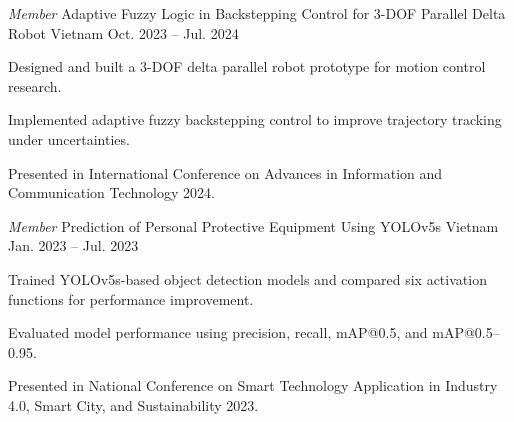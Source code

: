 \begin{cventries}
  \cventry
    {\textit{Member}}
    {Adaptive Fuzzy Logic in Backstepping Control for 3-DOF Parallel Delta Robot}
    {Vietnam}
    {Oct. 2023 -- Jul. 2024}
    {
      \begin{cvitems}
        \item {Designed and built a 3-DOF delta parallel robot prototype for motion control research.}
        \item {Implemented adaptive fuzzy backstepping control to improve trajectory tracking under uncertainties.}
        \item {Presented in International Conference on Advances in Information and Communication Technology 2024.}
      \end{cvitems}
    }

  \cventry
    {\textit{Member}}
    {Prediction of Personal Protective Equipment Using YOLOv5s}
    {Vietnam}
    {Jan. 2023 -- Jul. 2023}
    {
      \begin{cvitems}
        \item {Trained YOLOv5s-based object detection models and compared  six activation functions for performance improvement.}
        \item {Evaluated model performance using precision, recall, mAP@0.5, and mAP@0.5--0.95.}
        \item {Presented in National Conference on Smart Technology Application in Industry 4.0, Smart City, and Sustainability 2023.}
      \end{cvitems}
    }


\end{cventries}
